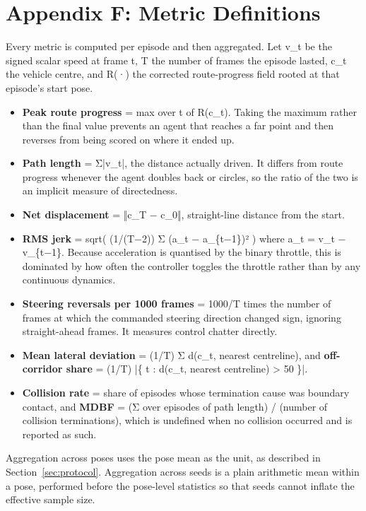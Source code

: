 \documentclass[conference]{IEEEtran}
\begin{document}
\section*{Appendix F: Metric Definitions}

\label{sec:appMetrics}

Every metric is computed per episode and then aggregated. Let v\_t be the signed scalar speed at frame t, T the number of frames the episode lasted, c\_t the vehicle centre, and R(·) the corrected route-progress field rooted at that episode's start pose.

\begin{itemize}
\item \textbf{Peak route progress} = max over t of R(c\_t). Taking the maximum rather than the final value prevents an agent that reaches a far point and then reverses from being scored on where it ended up.
\item \textbf{Path length} = Σ|v\_t|, the distance actually driven. It differs from route progress whenever the agent doubles back or circles, so the ratio of the two is an implicit measure of directedness.
\item \textbf{Net displacement} = ‖c\_T − c\_0‖, straight-line distance from the start.
\item \textbf{RMS jerk} = sqrt( (1/(T−2)) Σ (a\_t − a\_\{t−1\})² ) where a\_t = v\_t − v\_\{t−1\}. Because acceleration is quantised by the binary throttle, this is dominated by how often the controller toggles the throttle rather than by any continuous dynamics.
\item \textbf{Steering reversals per 1000 frames} = 1000/T times the number of frames at which the commanded steering direction changed sign, ignoring straight-ahead frames. It measures control chatter directly.
\item \textbf{Mean lateral deviation} = (1/T) Σ d(c\_t, nearest centreline), and \textbf{off-corridor share} = (1/T) |\{ t : d(c\_t, nearest centreline) > 50 \}|.
\item \textbf{Collision rate} = share of episodes whose termination cause was boundary contact, and \textbf{MDBF} = (Σ over episodes of path length) / (number of collision terminations), which is undefined when no collision occurred and is reported as such.
\end{itemize}

Aggregation across poses uses the pose mean as the unit, as described in Section~\ref{sec:protocol}. Aggregation across seeds is a plain arithmetic mean within a pose, performed before the pose-level statistics so that seeds cannot inflate the effective sample size.
\end{document}
